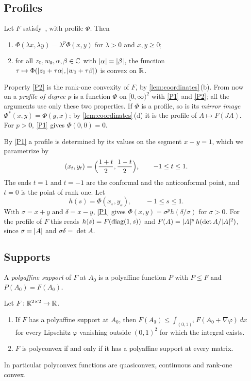 \subsection{Profiles}

\begin{lemma}\label{lem:profile}
Let $F$ satisfy~\Hyp, with profile $\Phi$. Then
\begin{enumerate}[label=\textup{(P\arabic*)},leftmargin=3em]
\item\label{P1} $\Phi(\lambda x,\lambda y)=\lambda^p\Phi(x,y)$ for $\lambda>0$ and $x,y\ge0$;
\item\label{P2} for all $z_0,w_0,\alpha,\beta\in\mathbb{C}$ with $\lvert \alpha\rvert=\lvert \beta\rvert$, the function
  $\tau\mapsto\Phi(\lvert z_0+\tau\alpha\rvert,\lvert w_0+\tau\beta\rvert)$ is convex on $\mathbb{R}$.
\end{enumerate}
\end{lemma}

Property \ref{P2} is the rank-one convexity of $F$, by \cref{lem:coordinates}\,(b). From now on
a \emph{profile of degree $p$} is a function $\Phi$ on $[0,\infty)^2$ with \ref{P1} and
\ref{P2}; all the arguments use only these two properties. If $\Phi$ is a profile, so is its
\emph{mirror image} $\Phi^\ast(x,y)=\Phi(y,x)$; by \cref{lem:coordinates}\,(d) it is the profile
of $A\mapsto F(JA)$. For $p>0$, \ref{P1} gives $\Phi(0,0)=0$.

By \ref{P1} a profile is determined by its values on the segment $x+y=1$, which we parametrize
by
\[
  (x_t,y_t)=\Bigl(\frac{1+t}2,\frac{1-t}2\Bigr),\qquad -1\le t\le1 .
\]
The ends $t=1$ and $t=-1$ are the conformal and the anticonformal point, and $t=0$ is the point
of rank one. Let
\[
  h(s)=\Phi(x_s,y_s),\qquad -1\le s\le1 .
\]
With $\sigma=x+y$ and $\delta=x-y$, \ref{P1} gives $\Phi(x,y)=\sigma^ph(\delta/\sigma)$ for
$\sigma>0$. For the profile of $F$ this reads $h(s)=F(\operatorname{diag}(1,s))$ and
$F(A)=\lvert A\rvert^p\,h(\det A/\lvert A\rvert^2)$, since $\sigma=\lvert A\rvert$ and $\sigma\delta=\det A$.

\subsection{Supports}

A \emph{polyaffine support} of $F$ at $A_0$ is a polyaffine function $P$ with $P\le F$ and
$P(A_0)=F(A_0)$.

\begin{lemma}\label{lem:supports}
Let $F\colon\mathbb{R}^{2\times 2}\to\mathbb{R}$.
\begin{enumerate}[label=\textup{(\alph*)}]
\item If $F$ has a polyaffine support at $A_0$, then
  $F(A_0)\le\int_{(0,1)^2}F(A_0+\nabla\varphi)\,dx$ for every Lipschitz $\varphi$ vanishing
  outside $(0,1)^2$ for which the integral exists.
\item $F$ is polyconvex if and only if it has a polyaffine support at every matrix.
\end{enumerate}
In particular polyconvex functions are quasiconvex, continuous and rank-one convex.
\end{lemma}

